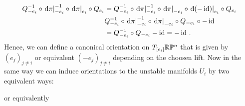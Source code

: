 \begin{example}
\begin{definition}[Orientations]
				\begin{align*}
					Q_{-e_i}^{-1}\circ \left.\mathop{}\!\mathrm{d} \pi\right|_{-e_i}^{-1}\circ \left.\mathop{}\!\mathrm{d} \pi\right|_{e_i}\circ Q_{e_i}
					&=Q_{-e_i}^{-1}\circ \left.\mathop{}\!\mathrm{d} \pi\right|_{-e_i}^{-1}\circ \left.\mathop{}\!\mathrm{d} \pi\right|_{-e_i} \circ \left.\mathop{}\!\mathrm{d} (-\operatorname{\mathrm{id}})\right|_{e_i} \circ Q_{e_i}\\
					&Q_{-e_i}^{-1}\circ \left.\mathop{}\!\mathrm{d} \pi\right|_{-e_i}^{-1}\circ \left.\mathop{}\!\mathrm{d} \pi\right|_{-e_i} \circ Q_{-e_i}\circ -\operatorname{\mathrm{id}} \\
					&=Q_{-e_i}^{-1}\circ Q_{-e_i} -\operatorname{\mathrm{id}} =-\operatorname{\mathrm{id}}\,.
				\end{align*} Hence, we can define a canonical orientation on $T_{[e_i]}\mathbb{R}\mathbb{P}^n$ that is given by $(e_j)_{j\neq i}$ or equivalent $(-e_j)_{j\neq i}$ depending on the choosen lift. Now in the same way we can induce orientations to the unstable manifolds $U_i$ by two equivalent ways:
							\begin{center}
					or equivalently 
					

\end{center}
\end{definition}
\end{example}
